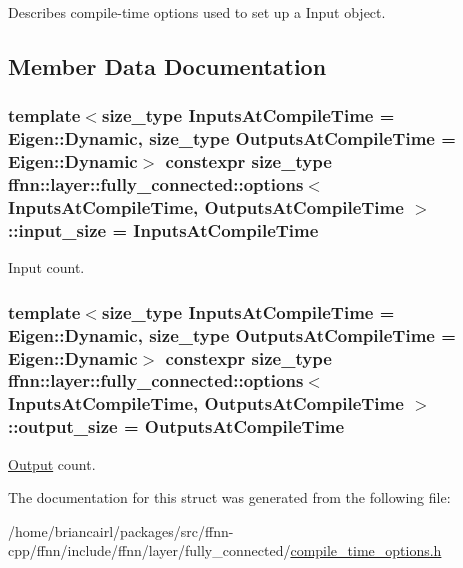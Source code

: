 Describes compile-\/time options used to set up a Input object. 

\subsection{Member Data Documentation}
\hypertarget{structffnn_1_1layer_1_1fully__connected_1_1options_ae136ed9ebf9016f397acc9f3c10c9a32}{
\subsubsection[{input\-\_\-size}]{\setlength{\rightskip}{0pt plus 5cm}template$<$size\-\_\-type Inputs\-At\-Compile\-Time = Eigen\-::\-Dynamic, size\-\_\-type Outputs\-At\-Compile\-Time = Eigen\-::\-Dynamic$>$ constexpr {\bf size\-\_\-type} {\bf ffnn\-::layer\-::fully\-\_\-connected\-::options}$<$ Inputs\-At\-Compile\-Time, Outputs\-At\-Compile\-Time $>$\-::input\-\_\-size = Inputs\-At\-Compile\-Time\hspace{0.3cm}{\ttfamily [static]}}}\label{structffnn_1_1layer_1_1fully__connected_1_1options_ae136ed9ebf9016f397acc9f3c10c9a32}


Input count. 

\hypertarget{structffnn_1_1layer_1_1fully__connected_1_1options_a7b40e94c99dc865af66d8f2ee5a8c4cc}{
\subsubsection[{output\-\_\-size}]{\setlength{\rightskip}{0pt plus 5cm}template$<$size\-\_\-type Inputs\-At\-Compile\-Time = Eigen\-::\-Dynamic, size\-\_\-type Outputs\-At\-Compile\-Time = Eigen\-::\-Dynamic$>$ constexpr {\bf size\-\_\-type} {\bf ffnn\-::layer\-::fully\-\_\-connected\-::options}$<$ Inputs\-At\-Compile\-Time, Outputs\-At\-Compile\-Time $>$\-::output\-\_\-size = Outputs\-At\-Compile\-Time\hspace{0.3cm}{\ttfamily [static]}}}\label{structffnn_1_1layer_1_1fully__connected_1_1options_a7b40e94c99dc865af66d8f2ee5a8c4cc}


\hyperlink{classffnn_1_1layer_1_1_output}{Output} count. 



The documentation for this struct was generated from the following file\-:\begin{DoxyCompactItemize}
\item 
/home/briancairl/packages/src/ffnn-\/cpp/ffnn/include/ffnn/layer/fully\-\_\-connected/\hyperlink{fully__connected_2compile__time__options_8h}{compile\-\_\-time\-\_\-options.\-h}\end{DoxyCompactItemize}
